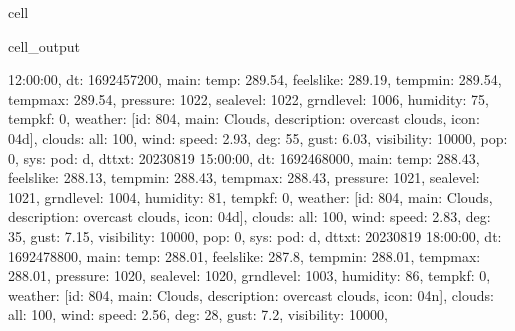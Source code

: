 \documentclass[letterpaper,10pt,english]{jupyterBook}
\begin{document}
\begin{sphinxuseclass}{cell}
\begin{sphinxVerbatimOutput}
\begin{sphinxuseclass}{cell_output}
\begin{sphinxVerbatim}[commandchars=\\\{\}]
12:00:00\PYGZsq{}\PYGZcb{}, \PYGZob{}\PYGZsq{}dt\PYGZsq{}: 1692457200, \PYGZsq{}main\PYGZsq{}: \PYGZob{}\PYGZsq{}temp\PYGZsq{}: 289.54, \PYGZsq{}feels\PYGZus{}like\PYGZsq{}: 289.19, \PYGZsq{}temp\PYGZus{}min\PYGZsq{}: 289.54, \PYGZsq{}temp\PYGZus{}max\PYGZsq{}: 289.54, \PYGZsq{}pressure\PYGZsq{}: 1022, \PYGZsq{}sea\PYGZus{}level\PYGZsq{}: 1022, \PYGZsq{}grnd\PYGZus{}level\PYGZsq{}: 1006, \PYGZsq{}humidity\PYGZsq{}: 75, \PYGZsq{}temp\PYGZus{}kf\PYGZsq{}: 0\PYGZcb{}, \PYGZsq{}weather\PYGZsq{}: [\PYGZob{}\PYGZsq{}id\PYGZsq{}: 804, \PYGZsq{}main\PYGZsq{}: \PYGZsq{}Clouds\PYGZsq{}, \PYGZsq{}description\PYGZsq{}: \PYGZsq{}overcast clouds\PYGZsq{}, \PYGZsq{}icon\PYGZsq{}: \PYGZsq{}04d\PYGZsq{}\PYGZcb{}], \PYGZsq{}clouds\PYGZsq{}: \PYGZob{}\PYGZsq{}all\PYGZsq{}: 100\PYGZcb{}, \PYGZsq{}wind\PYGZsq{}: \PYGZob{}\PYGZsq{}speed\PYGZsq{}: 2.93, \PYGZsq{}deg\PYGZsq{}: 55, \PYGZsq{}gust\PYGZsq{}: 6.03\PYGZcb{}, \PYGZsq{}visibility\PYGZsq{}: 10000, \PYGZsq{}pop\PYGZsq{}: 0, \PYGZsq{}sys\PYGZsq{}: \PYGZob{}\PYGZsq{}pod\PYGZsq{}: \PYGZsq{}d\PYGZsq{}\PYGZcb{}, \PYGZsq{}dt\PYGZus{}txt\PYGZsq{}: \PYGZsq{}2023\PYGZhy{}08\PYGZhy{}19 15:00:00\PYGZsq{}\PYGZcb{}, \PYGZob{}\PYGZsq{}dt\PYGZsq{}: 1692468000, \PYGZsq{}main\PYGZsq{}: \PYGZob{}\PYGZsq{}temp\PYGZsq{}: 288.43, \PYGZsq{}feels\PYGZus{}like\PYGZsq{}: 288.13, \PYGZsq{}temp\PYGZus{}min\PYGZsq{}: 288.43, \PYGZsq{}temp\PYGZus{}max\PYGZsq{}: 288.43, \PYGZsq{}pressure\PYGZsq{}: 1021, \PYGZsq{}sea\PYGZus{}level\PYGZsq{}: 1021, \PYGZsq{}grnd\PYGZus{}level\PYGZsq{}: 1004, \PYGZsq{}humidity\PYGZsq{}: 81, \PYGZsq{}temp\PYGZus{}kf\PYGZsq{}: 0\PYGZcb{}, \PYGZsq{}weather\PYGZsq{}: [\PYGZob{}\PYGZsq{}id\PYGZsq{}: 804, \PYGZsq{}main\PYGZsq{}: \PYGZsq{}Clouds\PYGZsq{}, \PYGZsq{}description\PYGZsq{}: \PYGZsq{}overcast clouds\PYGZsq{}, \PYGZsq{}icon\PYGZsq{}: \PYGZsq{}04d\PYGZsq{}\PYGZcb{}], \PYGZsq{}clouds\PYGZsq{}: \PYGZob{}\PYGZsq{}all\PYGZsq{}: 100\PYGZcb{}, \PYGZsq{}wind\PYGZsq{}: \PYGZob{}\PYGZsq{}speed\PYGZsq{}: 2.83, \PYGZsq{}deg\PYGZsq{}: 35, \PYGZsq{}gust\PYGZsq{}: 7.15\PYGZcb{}, \PYGZsq{}visibility\PYGZsq{}: 10000, \PYGZsq{}pop\PYGZsq{}: 0, \PYGZsq{}sys\PYGZsq{}: \PYGZob{}\PYGZsq{}pod\PYGZsq{}: \PYGZsq{}d\PYGZsq{}\PYGZcb{}, \PYGZsq{}dt\PYGZus{}txt\PYGZsq{}: \PYGZsq{}2023\PYGZhy{}08\PYGZhy{}19 18:00:00\PYGZsq{}\PYGZcb{}, \PYGZob{}\PYGZsq{}dt\PYGZsq{}: 1692478800, \PYGZsq{}main\PYGZsq{}: \PYGZob{}\PYGZsq{}temp\PYGZsq{}: 288.01, \PYGZsq{}feels\PYGZus{}like\PYGZsq{}: 287.8, \PYGZsq{}temp\PYGZus{}min\PYGZsq{}: 288.01, \PYGZsq{}temp\PYGZus{}max\PYGZsq{}: 288.01, \PYGZsq{}pressure\PYGZsq{}: 1020, \PYGZsq{}sea\PYGZus{}level\PYGZsq{}: 1020, \PYGZsq{}grnd\PYGZus{}level\PYGZsq{}: 1003, \PYGZsq{}humidity\PYGZsq{}: 86, \PYGZsq{}temp\PYGZus{}kf\PYGZsq{}: 0\PYGZcb{}, \PYGZsq{}weather\PYGZsq{}: [\PYGZob{}\PYGZsq{}id\PYGZsq{}: 804, \PYGZsq{}main\PYGZsq{}: \PYGZsq{}Clouds\PYGZsq{}, \PYGZsq{}description\PYGZsq{}: \PYGZsq{}overcast clouds\PYGZsq{}, \PYGZsq{}icon\PYGZsq{}: \PYGZsq{}04n\PYGZsq{}\PYGZcb{}], \PYGZsq{}clouds\PYGZsq{}: \PYGZob{}\PYGZsq{}all\PYGZsq{}: 100\PYGZcb{}, \PYGZsq{}wind\PYGZsq{}: \PYGZob{}\PYGZsq{}speed\PYGZsq{}: 2.56, \PYGZsq{}deg\PYGZsq{}: 28, \PYGZsq{}gust\PYGZsq{}: 7.2\PYGZcb{}, \PYGZsq{}visibility\PYGZsq{}: 10000, 
\end{sphinxVerbatim}
\end{sphinxuseclass}
\end{sphinxVerbatimOutput}
\end{sphinxuseclass}
\end{document}
